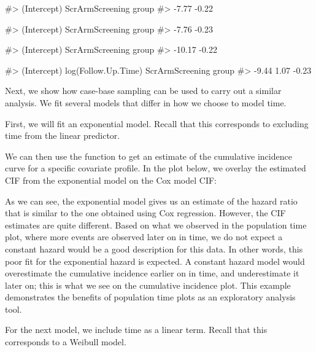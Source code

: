 \documentclass[
]{jss}
\begin{document}
\begin{CodeChunk}

\begin{CodeOutput}
#>           (Intercept) ScrArmScreening group 
#>                 -7.77                 -0.22
\end{CodeOutput}

\begin{CodeOutput}
#>           (Intercept) ScrArmScreening group 
#>                 -7.76                 -0.23
\end{CodeOutput}

\begin{CodeOutput}
#>           (Intercept) ScrArmScreening group 
#>                -10.17                 -0.22
\end{CodeOutput}

\begin{CodeOutput}
#>           (Intercept)   log(Follow.Up.Time) ScrArmScreening group 
#>                 -9.44                  1.07                 -0.23
\end{CodeOutput}
\end{CodeChunk}

Next, we show how case-base sampling can be used to carry out a similar
analysis. We fit several models that differ in how we choose to model
time.

First, we will fit an exponential model. Recall that this corresponds to
excluding time from the linear predictor.

We can then use the  function to get an estimate of
the cumulative incidence curve for a specific covariate profile. In the
plot below, we overlay the estimated CIF from the exponential model on
the Cox model CIF:

As we can see, the exponential model gives us an estimate of the hazard
ratio that is similar to the one obtained using Cox regression. However,
the CIF estimates are quite different. Based on what we observed in the
population time plot, where more events are observed later on in time,
we do not expect a constant hazard would be a good description for this
data. In other words, this poor fit for the exponential hazard is
expected. A constant hazard model would overestimate the cumulative
incidence earlier on in time, and underestimate it later on; this is
what we see on the cumulative incidence plot. This example demonstrates
the benefits of population time plots as an exploratory analysis tool.

For the next model, we include time as a linear term. Recall that this
corresponds to a Weibull model.
\end{document}
